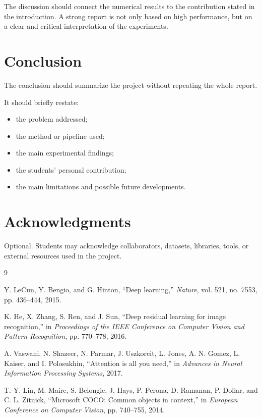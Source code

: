 \documentclass[10pt,twocolumn,a4paper]{article}
\begin{document}
 The discussion should connect the numerical results to the contribution stated in the introduction. A strong report is not only based on high performance, but on a clear and critical interpretation of the experiments.
 
 \section{Conclusion}
 
 The conclusion should summarize the project without repeating the whole report.
 
 It should briefly restate:
 \begin{itemize}
  \item the problem addressed;
  \item the method or pipeline used;
  \item the main experimental findings;
  \item the students' personal contribution;
  \item the main limitations and possible future developments.
 \end{itemize}
 
 \section*{Acknowledgments}
 
 Optional. Students may acknowledge collaborators, datasets, libraries, tools, or external resources used in the project.
 
 \begin{thebibliography}{9}
  
  Y. LeCun, Y. Bengio, and G. Hinton,
  ``Deep learning,''
  \textit{Nature}, vol. 521, no. 7553, pp. 436--444, 2015.
  
  K. He, X. Zhang, S. Ren, and J. Sun,
  ``Deep residual learning for image recognition,''
  in \textit{Proceedings of the IEEE Conference on Computer Vision and Pattern Recognition},
  pp. 770--778, 2016.
  
  A. Vaswani, N. Shazeer, N. Parmar, J. Uszkoreit, L. Jones, A. N. Gomez, L. Kaiser, and I. Polosukhin,
  ``Attention is all you need,''
  in \textit{Advances in Neural Information Processing Systems},
  2017.
  
  T.-Y. Lin, M. Maire, S. Belongie, J. Hays, P. Perona, D. Ramanan, P. Dollar, and C. L. Zitnick,
  ``Microsoft COCO: Common objects in context,''
  in \textit{European Conference on Computer Vision},
  pp. 740--755, 2014.
  
 \end{thebibliography}
 
\end{document}
